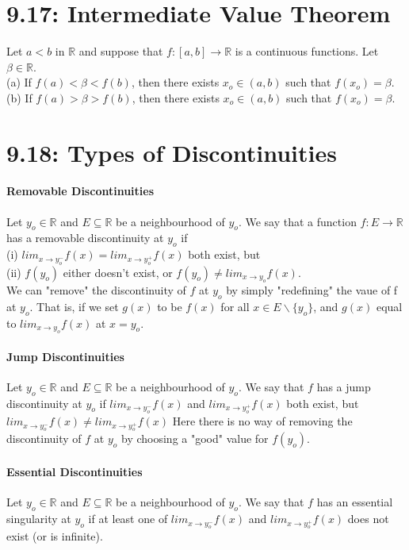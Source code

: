 \documentclass[10pt,letter]{report}
\begin{document}
\section*{9.17: Intermediate Value Theorem}
Let $a<b$ in $\mathbb{R}$ and suppose that $f:[a,b]\rightarrow\mathbb{R}$ is a continuous functions. Let $\beta\in\mathbb{R}$. \\ 
(a) If $f(a)<\beta<f(b)$, then there exists $x_o\in(a,b)$ such that $f(x_o)=\beta$. \\ 
(b) If $f(a)>\beta>f(b)$, then there exists $x_o\in(a,b)$ such that $f(x_o)=\beta$. 

\section*{9.18: Types of Discontinuities}
\paragraph*{Removable Discontinuities}
Let $y_o\in\mathbb{R}$ and $E\subseteq\mathbb{R}$ be a neighbourhood of $y_o$. We say that a function $f:E\rightarrow\mathbb{R}$ has a removable discontinuity at $y_o$ if \\ 
(i) $lim_{x\rightarrow y_o^-}f(x) = lim_{x\rightarrow y_o^+}f(x)$ both exist, but \\ 
(ii) $f(y_o)$ either doesn't exist, or $f(y_o)\neq lim_{x\rightarrow y_o}f(x)$. \\ 
We can "remove" the discontinuity of $f$ at $y_o$ by simply "redefining" the vaue of f at $y_o$. That is, if we set $g(x)$ to be $f(x)$ for all $x\in E\backslash\{y_o\}$, and $g(x)$ equal to $lim_{x\rightarrow y_o}f(x)$ at $x=y_o$. \\ 

\paragraph*{Jump Discontinuities} 
Let $y_o\in\mathbb{R}$ and $E\subseteq\mathbb{R}$ be a neighbourhood of $y_o$. We say that $f$ has a jump discontinuity at $y_o$ if $lim_{x\rightarrow y_o^-}f(x)$ and $lim_{x\rightarrow y_o^+}f(x)$ both exist, but $lim_{x\rightarrow y_o^-}f(x) \neq lim_{x\rightarrow y_o^+}f(x)$ Here there is no way of removing the discontinuity of $f$ at $y_o$ by choosing a "good" value for $f(y_o)$.

\paragraph*{Essential Discontinuities}
Let $y_o\in\mathbb{R}$ and $E\subseteq\mathbb{R}$ be a neighbourhood of $y_o$. We say that $f$ has an essential singularity at $y_o$ if at least one of $lim_{x\rightarrow y_o^-}f(x)$ and $lim_{x\rightarrow y_o^+}f(x)$ does not exist (or is infinite). 
\end{document}
